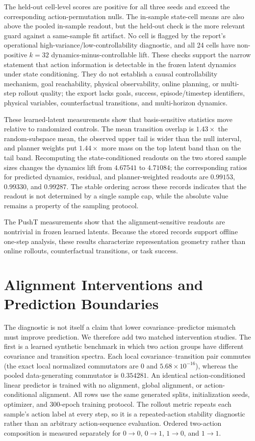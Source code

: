 \documentclass{article}
\begin{document}
The held-out cell-level scores are positive for all three seeds and exceed the
corresponding action-permutation nulls. The in-sample state-cell means are also
above the pooled in-sample readout, but the held-out check is the more relevant
guard against a same-sample fit artifact. No cell is flagged by the report's
operational high-variance/low-controllability diagnostic, and all 24 cells have
non-positive $k=32$ dynamics-minus-controllable lift. These checks support the
narrow statement that action information is detectable in the frozen latent
dynamics under state conditioning. They do not establish a causal
controllability mechanism, goal reachability, physical observability, online
planning, or multi-step rollout quality; the export lacks goals, success,
episode/timestep identifiers, physical variables, counterfactual transitions,
and multi-horizon dynamics.

These learned-latent measurements show that basis-sensitive statistics move
relative to randomized controls. The mean transition overlap is $1.43\times$
the random-subspace mean, the observed upper tail is wider than the null
interval, and planner weights put $1.44\times$ more mass on the top latent band
than on the tail band. Recomputing the state-conditioned readouts on the two
stored sample sizes changes the dynamics lift from $4.67541$ to $4.71084$;
the corresponding ratios for predicted dynamics, residual, and planner-weighted
readouts are $0.99153$, $0.99330$, and $0.99287$. The stable ordering across
these records indicates that the readout is not determined by a single sample
cap, while the absolute value remains a property of the sampling protocol.

The PushT measurements show that the alignment-sensitive readouts are nontrivial
in frozen learned latents. Because the stored records support offline one-step
analysis, these results characterize representation geometry rather than online
rollouts, counterfactual transitions, or task success.

\section{Alignment Interventions and Prediction Boundaries}
\label{sec:supp-intervention}

The diagnostic is not itself a claim that lower covariance--predictor mismatch
must improve prediction. We therefore add two matched intervention studies.
The first is a learned synthetic benchmark in which two action groups have
different covariance and transition spectra. Each local covariance--transition
pair commutes (the exact local normalized commutators are $0$ and
$5.68\times10^{-16}$), whereas the pooled data-generating commutator is
$0.354281$. An identical action-conditioned linear predictor is trained with
no alignment, global alignment, or action-conditional alignment. All rows use
the same generated splits, initialization seeds, optimizer, and 300-epoch
training protocol. The rollout metric repeats each sample's action label at
every step, so it is a repeated-action stability diagnostic rather than an
arbitrary action-sequence evaluation. Ordered two-action composition is
measured separately for $0\!\to\!0$, $0\!\to\!1$, $1\!\to\!0$, and
$1\!\to\!1$.
\end{document}
